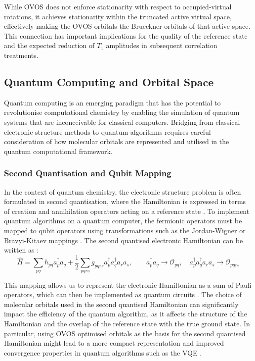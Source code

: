 While OVOS does not enforce stationarity with respect to occupied-virtual rotations, it achieves stationarity within the truncated active virtual space, effectively making the OVOS orbitals the Brueckner orbitals of that active space. This connection has important implications for the quality of the reference state and the expected reduction of $T_1$ amplitudes in subsequent correlation treatments. 



















\subsection{Quantum Computing and Orbital Space}
\label{subsec:QC_OS}

Quantum computing is an emerging paradigm that has the potential to revolutionise computational chemistry by enabling the simulation of quantum systems that are inconceivable for classical computers. Bridging from classical electronic structure methods to quantum algorithms requires careful consideration of how molecular orbitals are represented and utilised in the quantum computational framework. 

\subsubsection{Second Quantisation and Qubit Mapping}

In the context of quantum chemistry, the electronic structure problem is often formulated in second quantisation, where the Hamiltonian is expressed in terms of creation and annihilation operators acting on a reference state \cite{Helgaker2000}. To implement quantum algorithms on a quantum computer, the fermionic operators must be mapped to qubit operators using transformations such as the Jordan-Wigner or Bravyi-Kitaev mappings \cite{Seeley2012}. The second quantised electronic Hamiltonian can be written as \cite{Cao2019}:
$$\hat{H} = \sum_{pq} h_{pq} a_p^\dagger a_q + \frac{1}{2} \sum_{pqrs} g_{pqrs} a_p^\dagger a_q^\dagger a_r a_s, \qquad a_p^\dagger a_q \rightarrow \mathcal{O}_{pq}, \quad a_p^\dagger a_q^\dagger a_r a_s \rightarrow \mathcal{O}_{pqrs}$$

This mapping allows us to represent the electronic Hamiltonian as a sum of Pauli operators, which can then be implemented as quantum circuits \cite{Cao2019}. The choice of molecular orbitals used in the second quantised Hamiltonian can significantly impact the efficiency of the quantum algorithm, as it affects the structure of the Hamiltonian and the overlap of the reference state with the true ground state. In particular, using OVOS optimised orbitals as the basis for the second quantised Hamiltonian might lead to a more compact representation and improved convergence properties in quantum algorithms such as the VQE \cite{Adamowicz1987, Cao2019}. 

